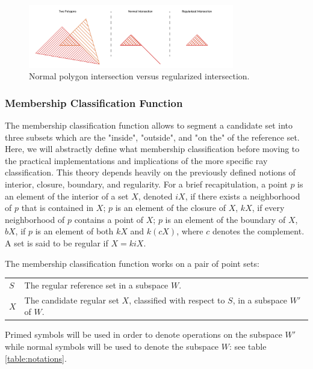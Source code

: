 \documentclass[a4paper,11pt,oneside]{article}
\makeatletter
\newenvironment{conditions}
  {\par\vspace{\abovedisplayskip}\noindent\begin{tabular}{>{$}l<{$} @{${}={}$} l}}
  {\end{tabular}\par\vspace{\belowdisplayskip}}
\makeatother
\begin{document}
\begin{figure}[ht]
	\begin{center}
		\includegraphics[width=0.8\textwidth]{section3/3.1/regularization.png}
	\end{center}
	\caption{Normal polygon intersection versus regularized intersection.}
	\label{sect3:regularization}
\end{figure}

\subsubsection{Membership Classification Function}
The membership classification function allows to segment a candidate set into three subsets which are the "inside", "outside", and "on the" of the reference set. Here, we will abstractly define what membership classification before moving to the practical implementations and implications of the more specific ray classification.
This theory depends heavily on the previously defined notions of interior, closure, boundary, and regularity. For a brief recapitulation, a point $p$ is an element of the interior of a set $X$, denoted $iX$, if there exists a neighborhood of $p$ that is contained in $X$; $p$ is an element of the closure of $X$, $kX$, if every neighborhood of $p$ contains a point of $X$; $p$ is an element of the boundary of $X$, $bX$, if $p$ is an element of both $kX$ and $k(cX)$, where $c$ denotes the complement. A set is said to be regular if $X = kiX$.

The membership classification function works on a pair of point sets:

\begin{conditions}
	S     &  The regular reference set in a subspace $W$. \\
	X     &  The candidate regular set $X$, classified with respect to $S$, in a subspace $W'$ of $W$. \\
\end{conditions}

Primed symbols will be used	in order to denote operations on the subspace $W'$ while normal symbols will be used to denote the subspace $W$: see table \ref{table:notations}.
 
\end{document}
